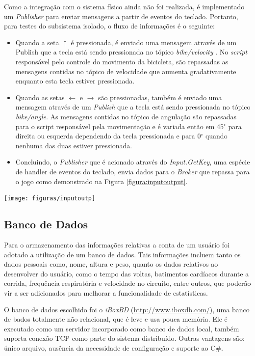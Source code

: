 Como a integração com o sistema físico ainda não foi realizada, é implementado um \textit{Publisher} para enviar mensagens a partir de eventos do teclado. Portanto, para testes do subsistema isolado, o fluxo de informações é o seguinte:

\begin{itemize}
\item Quando a seta ${\uparrow}$ é pressionada, é enviado uma mensagem através de um Publish que a tecla está sendo pressionada no tópico \textit{bike/velocity} . No \textit{script} responsável pelo controle do movimento da bicicleta, são repassadas as mensagens contidas no tópico de velocidade que aumenta gradativamente enquanto esta tecla estiver pressionada.
\item Quando as setas ${\leftarrow}$ e ${\rightarrow}$ são pressionadas, também é enviado uma mensagem através de um \textit{Publish} que a tecla está sendo pressionada no tópico \textit{bike/angle}. As mensagens contidas no tópico de angulação são repassadas para o script responsável pela movimentação e é variada então em 45$^{\circ}$  para direita ou esquerda dependendo da tecla pressionada e para 0$^{\circ}$  quando nenhuma das duas estiver pressionada.
\item Concluindo, o \textit{Publisher} que é acionado através do \textit{Input.GetKey}, uma espécie de handler de eventos do teclado,  envia dados para o \textit{Broker} que repassa para o jogo como demonstrado na Figura \ref{figura:inputoutput}.
\end{itemize}

\begin{center}
	\texttt{[image: figuras/inputoutp]}
	\label{figura:inputoutput}
\end{center}

\subsection{Banco de Dados}
Para o armazenamento das informações relativas a conta de um usuário foi adotado a utilização de um banco de dados. Tais informações incluem tanto os dados pessoais como, nome, altura e peso, quanto os dados relativos ao desenvolver do usuário, como o tempo das voltas, batimentos cardíacos durante a corrida, frequência respiratória e velocidade no circuito, entre outros, que poderão vir a ser adicionados para melhorar a funcionalidade de estatísticas.

O banco de dados escolhido foi o \textit{iBoxBD} (\url{http://www.iboxdb.com/}), uma banco de bados totalmente não relacional, que é leve e usa pouca memória. Ele é executado como um servidor incorporado como banco de dados local, também suporta conexão TCP como parte do sistema distribuído. Outras vantagens são: único arquivo, ausência da necessidade de configuração e suporte ao C\#.

